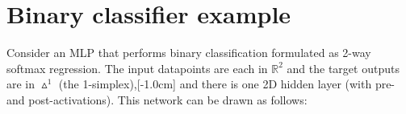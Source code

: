 


\section{Binary classifier example}
Consider an MLP that performs binary classification formulated as 2-way softmax regression. The input datapoints are each in $\mathbb{R}^2$ and the target outputs are in $\vartriangle^1$ (the 1-simplex),[-1.0cm] and there is one 2D hidden layer (with pre- and post-activations). This network can be drawn as follows:

